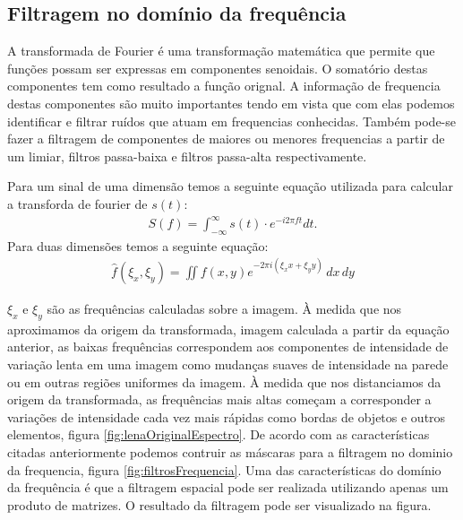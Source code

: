 \documentclass[
	article,			%
	11pt,				%
	oneside,			%
	a4paper,			%
	english,			%
	brazil,				%
	sumario=tradicional
	]{abntex2}
\begin{document}
\subsection{Filtragem no domínio da frequência}
A transformada de Fourier é uma transformação matemática que permite que funções
possam ser expressas em componentes senoidais. O somatório destas componentes
tem como resultado a função orignal. A informação de frequencia destas
componentes são muito importantes tendo em vista que com elas podemos
identificar e filtrar ruídos que atuam em frequencias conhecidas. Também pode-se
fazer a filtragem de componentes de maiores ou menores frequencias a partir de
um limiar, filtros passa-baixa e filtros passa-alta respectivamente.

Para um sinal de uma dimensão temos a seguinte equação utilizada para calcular a
transforda de fourier de $s(t)$:
\begin{align}
S(f) = \int_{-\infty}^{\infty} s(t) \cdot e^{-i 2\pi f t} dt.
\end{align}
Para duas dimensões temos a seguinte equação:
\begin{align}
\displaystyle \hat{f}(\xi_x, \xi_y)=
\displaystyle \iint f(x,y) e^{-2\pi i(\xi_x x+\xi_y y)}\,dx\,dy
\end{align}

$\xi_x$ e $\xi_y$ são as frequências calculadas sobre a imagem.
À medida que nos aproximamos da origem da transformada, imagem calculada a
partir da equação anterior, as baixas frequências correspondem aos componentes
de intensidade de variação lenta em uma imagem como mudanças suaves de
intensidade na parede ou em outras regiões uniformes da imagem.
À medida que nos distanciamos da origem da transformada, as frequências mais
altas começam a corresponder a variações de intensidade cada vez mais rápidas
como bordas de objetos e outros elementos, figura
\ref{fig:lenaOriginalEspectro}.
De acordo com as características citadas anteriormente podemos contruir as
máscaras para a filtragem  no dominio da frequencia, figura
\ref{fig:filtrosFrequencia}. Uma das características do domínio da frequência é
que a filtragem espacial pode ser realizada utilizando apenas um produto de
matrizes. O resultado da filtragem pode ser visualizado na figura.
\end{document}
